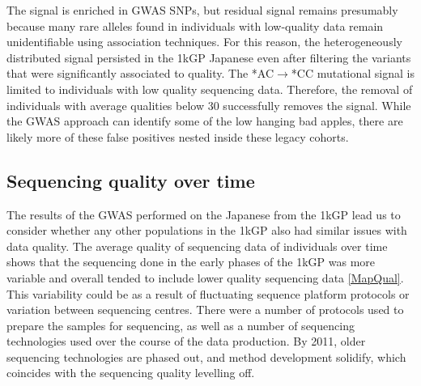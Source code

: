 \documentclass[9pt,lineno]{elife}
\begin{document}
The signal is enriched in GWAS SNPs, but residual signal remains presumably because many rare alleles found in individuals with low-quality data remain unidentifiable using association techniques.
For this reason, the heterogeneously distributed signal persisted in the 1kGP Japanese even after filtering the variants that were significantly associated to quality.
The *AC${\rightarrow}$*CC mutational signal is limited to individuals with low quality sequencing data.
Therefore, the removal of individuals with average qualities below 30 successfully removes the signal.
While the GWAS approach can identify some of the low hanging bad apples, there are likely more of these false positives nested inside these legacy cohorts.


	\subsection{Sequencing quality over time}
The results of the GWAS performed on the Japanese from the 1kGP lead us to consider whether any other populations in the 1kGP also had similar issues with data quality.
The average quality of sequencing data of individuals over time shows that the sequencing done in the early phases of the 1kGP was more variable and overall tended to include lower quality sequencing data \ref{MapQual}.
This variability could be as a result of fluctuating sequence platform protocols or variation between sequencing centres.
There were a number of protocols used to prepare the samples for sequencing, as well as a number of sequencing technologies used over the course of the data production.
By 2011, older sequencing technologies are phased out, and method development solidify, which coincides with the sequencing quality levelling off.
\end{document}
